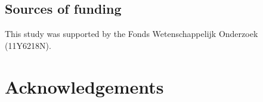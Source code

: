 %
%
%
%
%
%

\section{Sources of funding}
This study was supported by the Fonds Wetenschappelijk Onderzoek (11Y6218N).

\newpage{\thispagestyle{empty}\cleardoublepage}
\chapter*{Acknowledgements}


